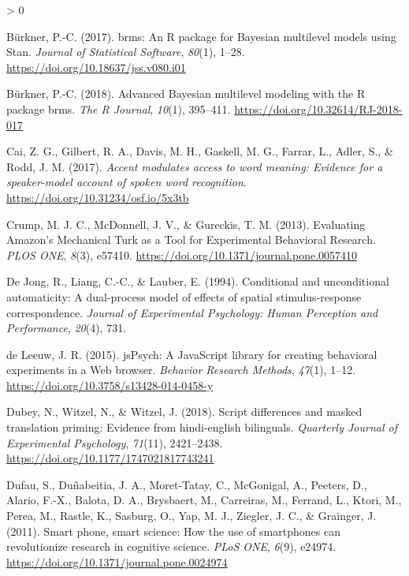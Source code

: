 \documentclass[
  english,
  man,floatsintext]{apa6}
\newlength{\cslhangindent}
\newenvironment{CSLReferences}[2] %
 {%
  \setlength{\parindent}{0pt}
  \ifodd #1 \everypar{\setlength{\hangindent}{\cslhangindent}}\ignorespaces\fi
  \ifnum #2 > 0
  \setlength{\parskip}{#2\baselineskip}
  \fi
 }%
 {}
\begin{document}
\begin{CSLReferences}{1}{0}
\leavevmode\hypertarget{ref-R-brms_a}{}%
Bürkner, P.-C. (2017). {brms}: An {R} package for {Bayesian} multilevel models using {Stan}. \emph{Journal of Statistical Software}, \emph{80}(1), 1--28. \url{https://doi.org/10.18637/jss.v080.i01}

\leavevmode\hypertarget{ref-R-brms_b}{}%
Bürkner, P.-C. (2018). Advanced {Bayesian} multilevel modeling with the {R} package {brms}. \emph{The R Journal}, \emph{10}(1), 395--411. \url{https://doi.org/10.32614/RJ-2018-017}

\leavevmode\hypertarget{ref-cai2017accent}{}%
Cai, Z. G., Gilbert, R. A., Davis, M. H., Gaskell, M. G., Farrar, L., Adler, S., \& Rodd, J. M. (2017). \emph{Accent modulates access to word meaning: Evidence for a speaker-model account of spoken word recognition}. \url{https://doi.org/10.31234/osf.io/5x3tb}

\leavevmode\hypertarget{ref-crump2013}{}%
Crump, M. J. C., McDonnell, J. V., \& Gureckis, T. M. (2013). Evaluating Amazon's Mechanical Turk as a Tool for Experimental Behavioral Research. \emph{PLOS ONE}, \emph{8}(3), e57410. \url{https://doi.org/10.1371/journal.pone.0057410}

\leavevmode\hypertarget{ref-de1994conditional}{}%
De Jong, R., Liang, C.-C., \& Lauber, E. (1994). Conditional and unconditional automaticity: A dual-process model of effects of spatial stimulus-response correspondence. \emph{Journal of Experimental Psychology: Human Perception and Performance}, \emph{20}(4), 731.

\leavevmode\hypertarget{ref-deleeuw2015}{}%
de Leeuw, J. R. (2015). jsPsych: A JavaScript library for creating behavioral experiments in a Web browser. \emph{Behavior Research Methods}, \emph{47}(1), 1--12. \url{https://doi.org/10.3758/s13428-014-0458-y}

\leavevmode\hypertarget{ref-Dubey_2018}{}%
Dubey, N., Witzel, N., \& Witzel, J. (2018). Script differences and masked translation priming: Evidence from hindi-english bilinguals. \emph{Quarterly Journal of Experimental Psychology}, \emph{71}(11), 2421--2438. \url{https://doi.org/10.1177/1747021817743241}

\leavevmode\hypertarget{ref-Dufau_2011}{}%
Dufau, S., Duñabeitia, J. A., Moret-Tatay, C., McGonigal, A., Peeters, D., Alario, F.-X., Balota, D. A., Brysbaert, M., Carreiras, M., Ferrand, L., Ktori, M., Perea, M., Rastle, K., Sasburg, O., Yap, M. J., Ziegler, J. C., \& Grainger, J. (2011). Smart phone, smart science: How the use of smartphones can revolutionize research in cognitive science. \emph{{PLoS} {ONE}}, \emph{6}(9), e24974. \url{https://doi.org/10.1371/journal.pone.0024974}


\end{CSLReferences}
\end{document}
